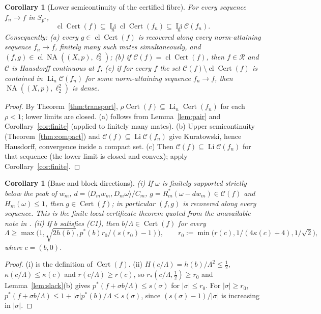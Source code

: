 \documentclass[10pt]{amsart}
\newtheorem{corollary}[theorem]{Corollary}
\theoremstyle{definition}
\theoremstyle{remark}
\newcommand{\NA}{\operatorname{NA}}
\newcommand{\Cset}{\mathcal C}
\newcommand{\Cert}{\operatorname{Cert}}
\newcommand{\Li}{\operatorname*{Li}}
\newcommand{\cl}{\operatorname{cl}}
\newcommand{\Rec}{\mathcal R}
\newcommand{\ip}[2]{\langle #1,#2\rangle}
\begin{document}
\begin{corollary}[Lower semicontinuity of the certified fibre]\label{cor:lsc}
For every sequence $f_n\to f$ in $S_{p^*}$,
\[
 \cl\Cert(f)\subseteq\Li_n\cl\Cert(f_n)\subseteq\Li_n\Cset(f_n).
\]
Consequently: \textup{(a)} every $g\in\cl\Cert(f)$ is recovered along every
norm-attaining sequence $f_n\to f$, finitely many such mates simultaneously,
and $(f,g)\in\cl\NA((X,p),\ell_2^2)$; \textup{(b)} if
$\Cset(f)=\cl\Cert(f)$, then $f\in\Rec$ and $\Cset$ is Hausdorff continuous
at $f$; \textup{(c)} if for every $f$ the set $\Cset(f)\setminus\cl\Cert(f)$
is contained in $\Li_n\Cset(f_n)$ for \emph{some} norm-attaining sequence
$f_n\to f$, then $\NA((X,p),\ell_2^2)$ is dense.
\end{corollary}

\begin{proof}
By Theorem~\ref{thm:transport}, $\rho\Cert(f)\subseteq\Li_n\Cert(f_n)$ for
each $\rho<1$; lower limits are closed.  (a) follows from
Lemma~\ref{lem:pair} and Corollary~\ref{cor:finite} (applied to finitely
many mates).  (b) Upper semicontinuity (Theorem~\ref{thm:compact}) and
$\Cset(f)\subseteq\Li\Cset(f_n)$ give Kuratowski, hence Hausdorff,
convergence inside a compact set.  (c) Then $\Cset(f)\subseteq
\Li\Cset(f_n)$ for that sequence (the lower limit is closed and convex);
apply Corollary~\ref{cor:finite}.
\end{proof}

\begin{corollary}[Base and block directions]\label{cor:check}
\textup{(i)} If $\omega$ is finitely supported strictly below the peak of
$w_m$, $d=\ip{D_mw_m}{D_m\omega}/C_m$, $g=R_m^*(\omega-dw_m)\in\Cset(f)$
and $H_m(\omega)\le1$, then $g\in\Cert(f)$; in particular $(f,g)$ is
recovered along every sequence.  This is the finite local-certificate
theorem quoted from the unavailable note \cite{Check} in \cite{PrA}.
\textup{(ii)} If $b$ satisfies \textup{(C1)}, then $b/\Lambda\in\Cert(f)$
for every
\[
 \Lambda\ge\max\big(1,\sqrt{2h(b)},p^*(b)r_0/(s(r_0)-1)\big),
 \qquad r_0:=\min\big(r(c),1/(4\kappa(c)+4),1/\sqrt2\big),
\]
where $c=(b,0)$.
\end{corollary}

\begin{proof}
(i) is the definition of $\Cert(f)$.  (ii) $H(c/\Lambda)=h(b)/\Lambda^2\le
\frac12$, $\kappa(c/\Lambda)\le\kappa(c)$ and $r(c/\Lambda)\ge r(c)$, so
$r_*(c/\Lambda,\frac12)\ge r_0$ and Lemma~\ref{lem:slack}(b) gives
$p^*(f+\sigma b/\Lambda)\le s(\sigma)$ for $|\sigma|\le r_0$.  For
$|\sigma|\ge r_0$, $p^*(f+\sigma b/\Lambda)\le1+|\sigma|p^*(b)/\Lambda\le
s(\sigma)$, since $(s(\sigma)-1)/|\sigma|$ is increasing in $|\sigma|$.
\end{proof}
\end{document}
